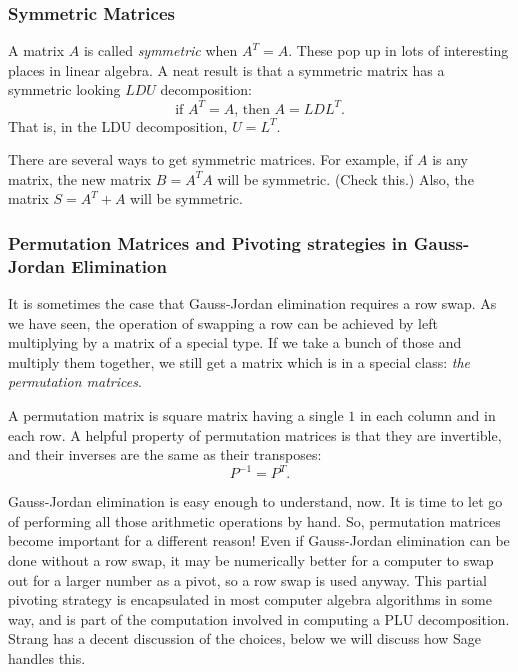 \documentclass[10pt,]{book}
\theoremstyle{plain}
\numberwithin{equation}{section}
\begin{document}
\subsubsection[Symmetric Matrices]{Symmetric Matrices}\label{subsubsection-30}

        A matrix \(A\) is called \emph{symmetric} when \(A^T = A\). These
        pop up in lots of interesting places in linear algebra. A neat result
        is that a symmetric matrix has a symmetric looking \(LDU\) decomposition:
        \[
        \text{if } A^T=A\text{, then } A = LDL^T .
        \]
        That is, in the LDU decomposition, \(U = L^T\).
\par

        There are several ways to get symmetric matrices. For example, if
        \(A\) is any matrix, the new matrix \(B = A^T A\) will be symmetric.
        (Check this.) Also, the matrix \(S = A^T + A\) will be symmetric.
\typeout{************************************************}
\typeout{************************************************}
\subsubsection[Permutation Matrices and Pivoting strategies in Gauss-Jordan Elimination]{Permutation Matrices and Pivoting strategies in Gauss-Jordan Elimination}\label{subsubsection-31}

        It is sometimes the case that Gauss-Jordan elimination requires a row
        swap. As we have seen, the operation of swapping a row can be achieved
        by left multiplying by a matrix of a special type. If we take a bunch of
        those and multiply them together, we still get a matrix which is in a
        special class: \emph{the permutation matrices}.
\par

        A permutation matrix is square matrix having a single \(1\) in each column
        and in each row. A helpful property of permutation matrices is that they
        are invertible, and their inverses are the same as their transposes:
        \[
        P^{-1} = P^T .
        \]
\par

        Gauss-Jordan elimination is easy enough to understand, now. It is time
        to let go of performing all those arithmetic operations by hand. So,
        permutation matrices become important for a different reason! Even if
        Gauss-Jordan elimination can be done without a row swap, it may be
        numerically better for a computer to swap out for a larger number as a
        pivot, so a row swap is used anyway. This partial pivoting strategy is
        encapsulated in most computer algebra algorithms in some way, and is
        part of the computation involved in computing a PLU decomposition.
        Strang has a decent discussion of the choices, below we will
        discuss how Sage handles this.
\typeout{************************************************}
\typeout{************************************************}
\end{document}
